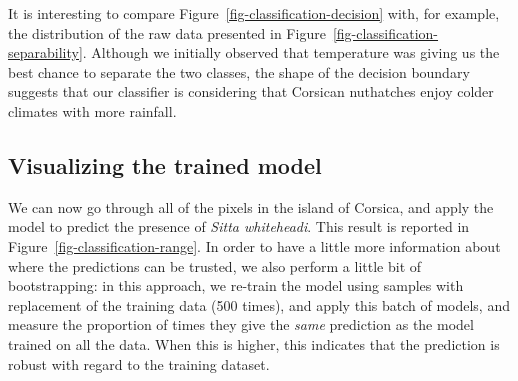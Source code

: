 \documentclass[
  letterpaper,
]{scrbook}
\begin{document}

It is interesting to compare Figure~\ref{fig-classification-decision}
with, for example, the distribution of the raw data presented in
Figure~\ref{fig-classification-separability}. Although we initially
observed that temperature was giving us the best chance to separate the
two classes, the shape of the decision boundary suggests that our
classifier is considering that Corsican nuthatches enjoy colder climates
with more rainfall.

\subsection{Visualizing the trained
model}\label{visualizing-the-trained-model}

We can now go through all of the pixels in the island of Corsica, and
apply the model to predict the presence of \emph{Sitta whiteheadi}. This
result is reported in Figure~\ref{fig-classification-range}. In order to
have a little more information about where the predictions can be
trusted, we also perform a little bit of bootstrapping: in this
approach, we re-train the model using samples with replacement of the
training data (500 times), and apply this batch of models, and measure
the proportion of times they give the \emph{same} prediction as the
model trained on all the data. When this is higher, this indicates that
the prediction is robust with regard to the training dataset.

{
\makeatletter
\def\LT@makecaption#1#2#3{%
  \noalign{\smash{\hbox{\kern\textwidth\rlap{\kern\marginparsep
  \parbox[t]{\marginparwidth}{%
    \footnotesize{%
      \vspace{(1.1\baselineskip)}
    #1{#2: }\ignorespaces #3}}}}}}%
    }
\makeatother

\begin{figure}[bt]



\end{figure}%

}
\end{document}
